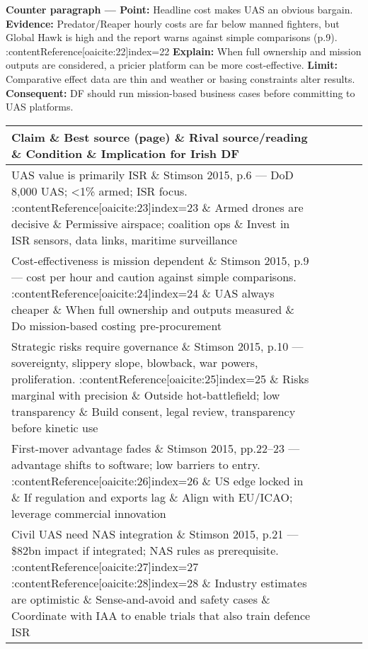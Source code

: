 \textbf{Counter paragraph — Point:} Headline cost makes UAS an obvious bargain.  
\textbf{Evidence:} Predator/Reaper hourly costs are far below manned fighters, but Global Hawk is high and the report warns against simple comparisons (p.9). :contentReference[oaicite:22]{index=22}  
\textbf{Explain:} When full ownership and mission outputs are considered, a pricier platform can be more cost-effective.  
\textbf{Limit:} Comparative effect data are thin and weather or basing constraints alter results.  
\textbf{Consequent:} DF should run mission-based business cases before committing to UAS platforms.

 
\begin{tabular}{p{3.2cm}p{4.2cm}p{3.6cm}p{3.2cm}p{4.2cm}}
	\textbf{Claim} \& \textbf{Best source (page)} \& \textbf{Rival source/reading} \& \textbf{Condition} \& \textbf{Implication for Irish DF}\\\hline
	UAS value is primarily ISR \& Stimson 2015, p.6 — DoD 8{,}000 UAS; <1\% armed; ISR focus. :contentReference[oaicite:23]{index=23} \& Armed drones are decisive \& Permissive airspace; coalition ops \& Invest in ISR sensors, data links, maritime surveillance \\
	Cost-effectiveness is mission dependent \& Stimson 2015, p.9 — cost per hour and caution against simple comparisons. :contentReference[oaicite:24]{index=24} \& UAS always cheaper \& When full ownership and outputs measured \& Do mission-based costing pre-procurement \\
	Strategic risks require governance \& Stimson 2015, p.10 — sovereignty, slippery slope, blowback, war powers, proliferation. :contentReference[oaicite:25]{index=25} \& Risks marginal with precision \& Outside hot-battlefield; low transparency \& Build consent, legal review, transparency before kinetic use \\
	First-mover advantage fades \& Stimson 2015, pp.22–23 — advantage shifts to software; low barriers to entry. :contentReference[oaicite:26]{index=26} \& US edge locked in \& If regulation and exports lag \& Align with EU/ICAO; leverage commercial innovation \\
	Civil UAS need NAS integration \& Stimson 2015, p.21 — \$82bn impact if integrated; NAS rules as prerequisite. :contentReference[oaicite:27]{index=27} :contentReference[oaicite:28]{index=28} \& Industry estimates are optimistic \& Sense-and-avoid and safety cases \& Coordinate with IAA to enable trials that also train defence ISR \\\hline
\end{tabular}

